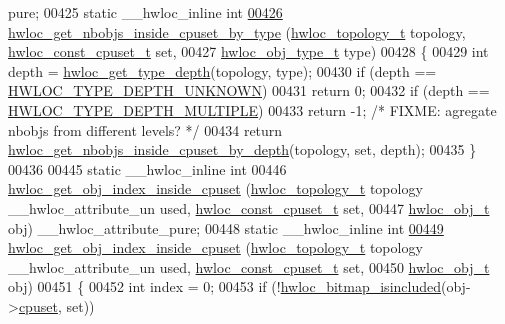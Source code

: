 \begin{DoxyCode}
      pure;
00425 \textcolor{keyword}{static} \_\_hwloc\_inline \textcolor{keywordtype}{int}
\hypertarget{a00031_source_l00426}{}\hyperlink{a00054_ga63481874c69ed257b1a0c03e7615ff97}{00426} \hyperlink{a00054_ga63481874c69ed257b1a0c03e7615ff97}{hwloc_get_nbobjs_inside_cpuset_by_type} (\hyperlink{a00039_ga9d1e76ee15a7dee158b786c30b6a6e38}{hwloc_topology_t} topology, 
      \hyperlink{a00040_ga1f784433e9b606261f62d1134f6a3b25}{hwloc_const_cpuset_t} \textcolor{keyword}{set},
00427                                         \hyperlink{a00041_gacd37bb612667dc437d66bfb175a8dc55}{hwloc_obj_type_t} type)
00428 \{
00429   \textcolor{keywordtype}{int} depth = \hyperlink{a00046_gaea7c64dd59467f5201ba87712710b14d}{hwloc_get_type_depth}(topology, type);
00430   \textcolor{keywordflow}{if} (depth == \hyperlink{a00046_ggaf4e663cf42bbe20756b849c6293ef575a0565ab92ab72cb0cec91e23003294aad}{HWLOC_TYPE_DEPTH_UNKNOWN})
00431     \textcolor{keywordflow}{return} 0;
00432   \textcolor{keywordflow}{if} (depth == \hyperlink{a00046_ggaf4e663cf42bbe20756b849c6293ef575ae99465995cacde6c210d5fc2e409798c}{HWLOC_TYPE_DEPTH_MULTIPLE})
00433     \textcolor{keywordflow}{return} -1; \textcolor{comment}{/* FIXME: agregate nbobjs from different levels? */}
00434   \textcolor{keywordflow}{return} \hyperlink{a00054_ga457604a2dedbf70ba3b480558666b56b}{hwloc_get_nbobjs_inside_cpuset_by_depth}(topology, \textcolor{keyword}{set}, depth);
00435 \}
00436 
00445 \textcolor{keyword}{static} \_\_hwloc\_inline \textcolor{keywordtype}{int}
00446 \hyperlink{a00054_ga7cdb6a4645e9b1ec80137e72d1736fdd}{hwloc_get_obj_index_inside_cpuset} (\hyperlink{a00039_ga9d1e76ee15a7dee158b786c30b6a6e38}{hwloc_topology_t} topology \_\_hwloc\_attribute\_un
      used, \hyperlink{a00040_ga1f784433e9b606261f62d1134f6a3b25}{hwloc_const_cpuset_t} \textcolor{keyword}{set},
00447                                    \hyperlink{a00016}{hwloc_obj_t} obj) \_\_hwloc\_attribute\_pure;
00448 \textcolor{keyword}{static} \_\_hwloc\_inline \textcolor{keywordtype}{int}
\hypertarget{a00031_source_l00449}{}\hyperlink{a00054_ga7cdb6a4645e9b1ec80137e72d1736fdd}{00449} \hyperlink{a00054_ga7cdb6a4645e9b1ec80137e72d1736fdd}{hwloc_get_obj_index_inside_cpuset} (\hyperlink{a00039_ga9d1e76ee15a7dee158b786c30b6a6e38}{hwloc_topology_t} topology \_\_hwloc\_attribute\_un
      used, \hyperlink{a00040_ga1f784433e9b606261f62d1134f6a3b25}{hwloc_const_cpuset_t} \textcolor{keyword}{set},
00450                                    \hyperlink{a00016}{hwloc_obj_t} obj)
00451 \{
00452   \textcolor{keywordtype}{int} index = 0;
00453   \textcolor{keywordflow}{if} (!\hyperlink{a00065_gaae29e14a926c198e8f91e6e4790621e7}{hwloc_bitmap_isincluded}(obj->\hyperlink{a00016_a67925e0f2c47f50408fbdb9bddd0790f}{cpuset}, \textcolor{keyword}{set}))

\end{DoxyCode}
